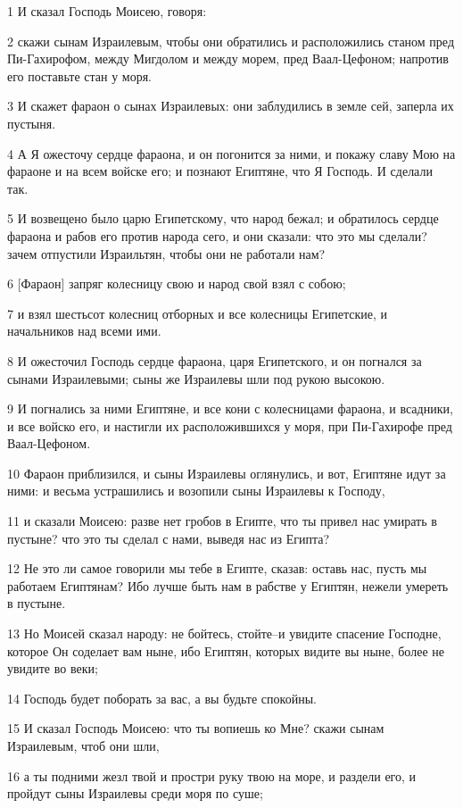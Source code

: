 \par 1 И сказал Господь Моисею, говоря:
\par 2 скажи сынам Израилевым, чтобы они обратились и расположились станом пред Пи-Гахирофом, между Мигдолом и между морем, пред Ваал-Цефоном; напротив его поставьте стан у моря.
\par 3 И скажет фараон о сынах Израилевых: они заблудились в земле сей, заперла их пустыня.
\par 4 А Я ожесточу сердце фараона, и он погонится за ними, и покажу славу Мою на фараоне и на всем войске его; и познают Египтяне, что Я Господь. И сделали так.
\par 5 И возвещено было царю Египетскому, что народ бежал; и обратилось сердце фараона и рабов его против народа сего, и они сказали: что это мы сделали? зачем отпустили Израильтян, чтобы они не работали нам?
\par 6 [Фараон] запряг колесницу свою и народ свой взял с собою;
\par 7 и взял шестьсот колесниц отборных и все колесницы Египетские, и начальников над всеми ими.
\par 8 И ожесточил Господь сердце фараона, царя Египетского, и он погнался за сынами Израилевыми; сыны же Израилевы шли под рукою высокою.
\par 9 И погнались за ними Египтяне, и все кони с колесницами фараона, и всадники, и все войско его, и настигли их расположившихся у моря, при Пи-Гахирофе пред Ваал-Цефоном.
\par 10 Фараон приблизился, и сыны Израилевы оглянулись, и вот, Египтяне идут за ними: и весьма устрашились и возопили сыны Израилевы к Господу,
\par 11 и сказали Моисею: разве нет гробов в Египте, что ты привел нас умирать в пустыне? что это ты сделал с нами, выведя нас из Египта?
\par 12 Не это ли самое говорили мы тебе в Египте, сказав: оставь нас, пусть мы работаем Египтянам? Ибо лучше быть нам в рабстве у Египтян, нежели умереть в пустыне.
\par 13 Но Моисей сказал народу: не бойтесь, стойте--и увидите спасение Господне, которое Он соделает вам ныне, ибо Египтян, которых видите вы ныне, более не увидите во веки;
\par 14 Господь будет поборать за вас, а вы будьте спокойны.
\par 15 И сказал Господь Моисею: что ты вопиешь ко Мне? скажи сынам Израилевым, чтоб они шли,
\par 16 а ты подними жезл твой и простри руку твою на море, и раздели его, и пройдут сыны Израилевы среди моря по суше;
